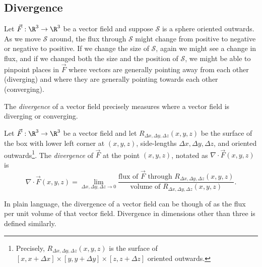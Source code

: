 \subsection{Divergence}

Let $\vec F:\R^3\to\R^3$ be a vector field and suppose $\mathcal S$ is a 
sphere oriented outwards.  As we move $\mathcal S$ around,
the flux through $\mathcal S$ might change from positive to negative or negative to positive.
If we change the size of $\mathcal S$, again we might see a change in flux, and if
we changed both the size and the position of $\mathcal S$, we might be able to pinpoint
places in $\vec F$ where vectors are generally pointing away from each other (diverging)
and where they are generally pointing towards each other (converging).


The \emph{divergence} of a vector field precisely measures
where a vector field is diverging or converging.  

\begin{definition}[Divergence]
	Let $\vec F:\R^3\to\R^3$ be a vector field and let $R_{\Delta x,\Delta y,\Delta z}(x,y,z)$
	be the surface of the box with lower left corner at $(x,y,z)$,
	side-lengths $\Delta x,\Delta y,\Delta z$,
	and oriented outwards\footnote{ Precisely, $R_{\Delta x,\Delta y,\Delta z}(x,y,z)$
	is the surface of  $[x,x+\Delta x]\times[y,y+\Delta y]\times[z,z+\Delta z]$ oriented outwards.}.
	The \emph{divergence} of $\vec F$ at the point $(x,y,z)$, notated as $\nabla \cdot \vec F(x,y,z)$
	is
	\[
		\nabla \cdot \vec F(x,y,z) = \lim_{\Delta x,\Delta y,\Delta z\to 0}
		\frac{\text{flux of }\vec F\text{ through }R_{\Delta x,\Delta y,\Delta z}(x,y,z)}
		{\text{volume of }
		R_{\Delta x,\Delta y,\Delta z}(x,y,z)}.
	\]
\end{definition}

In plain language, the divergence of a vector field can be though of as the flux per unit volume
of that vector field.  Divergence in dimensions other than three is defined similarly.

